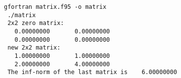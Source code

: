 \begin{Verbatim}[frame=lines,label=matrix - commands and output]
 gfortran matrix.f95 -o matrix
 ./matrix
 2x2 zero matrix: 
   0.00000000       0.00000000    
   0.00000000       0.00000000    
 new 2x2 matrix: 
   1.00000000       1.00000000    
   2.00000000       4.00000000    
 The inf-norm of the last matrix is    6.00000000    
\end{Verbatim}

